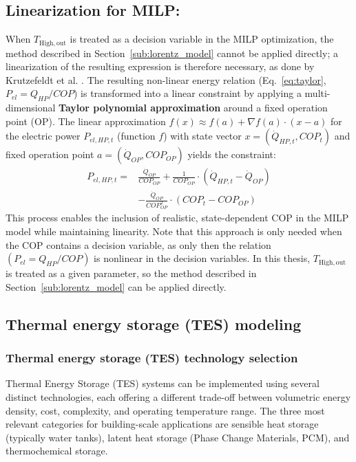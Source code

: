 \documentclass[11pt,a4paper]{report}
\begin{document}
\subsection{Linearization for MILP:} 
When $T_{\mathrm{High,out}}$ is treated as a decision variable in the MILP optimization, the method described in Section~\ref{sub:lorentz_model} cannot be applied directly; a linearization of the resulting expression is therefore necessary, as done by Krutzefeldt et al. \cite{Germanbuiling}. The resulting non-linear energy relation (Eq.~\eqref{eq:taylor}, $P_{el} = Q_{HP} / COP$) is transformed into a linear constraint by applying a multi-dimensional \textbf{Taylor polynomial approximation} around a fixed operation point (OP). The linear approximation $f(x) \approx f(a) + \nabla f(a) \cdot (x-a)$ for the electric power $P_{el, HP, t}$ (function $f$) with state vector $x = (\dot{Q}_{HP, t}, COP_{ t})$ and fixed operation point $a = (\dot{Q}_{OP}, COP_{OP})$ yields the constraint:
\begin{equation}
\begin{split}
\label{eq:taylor}
P_{el,HP,t} = &\frac{\dot{Q}_{OP}}{COP_{OP}} + \frac{1}{COP_{OP}} \cdot (\dot{Q}_{HP,t} - \dot{Q}_{OP}) \\
&- \frac{\dot{Q}_{OP}}{COP_{OP}^{2}} \cdot (COP_{t} - COP_{OP})
\end{split}
\end{equation}
This process enables the inclusion of realistic, state-dependent COP in the MILP model while maintaining linearity. Note that this approach is only needed when the COP contains a decision variable, as only then the relation $\left(P_{el} = Q_{HP} / COP\right)$ is nonlinear in the decision variables. In this thesis, $T_{\mathrm{High,out}}$ is treated as a given parameter, so the method described in Section~\ref{sub:lorentz_model} can be applied directly.

\subsection{Thermal energy storage (TES) modeling}

\subsubsection{Thermal energy storage (TES) technology selection}

Thermal Energy Storage (TES) systems can be implemented using several distinct technologies, each offering a different trade-off between volumetric energy density, cost, complexity, and operating temperature range. The three most relevant categories for building-scale applications are sensible heat storage (typically water tanks), latent heat storage (Phase Change Materials, PCM), and thermochemical storage.
\end{document}
